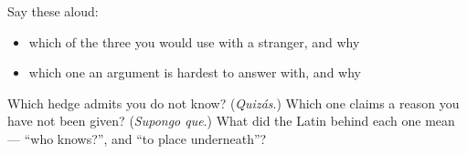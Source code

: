 Say these aloud:

\begin{itemize}
\raggedright
  \item which of the three you would use with a stranger, and why
  \item which one an argument is hardest to answer with, and why
\end{itemize}

\begin{tcolorbox}[breakable,colback=teal!4,colframe=teal!35!black,title={Before you move on}]
Which hedge admits you do not know? (\emph{Quizás}.) Which one claims a reason you have not been given? (\emph{Supongo que}.) What did the Latin behind each one mean — \textquotedblleft{}who knows?\textquotedblright{}, and \textquotedblleft{}to place underneath\textquotedblright{}?
\end{tcolorbox}
